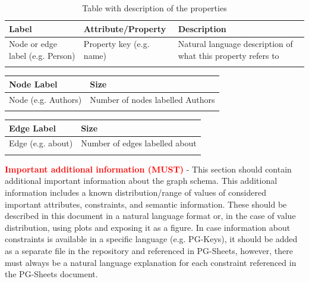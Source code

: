 \documentclass[letterpaper,11pt]{article}
\begin{document}
\begin{table}[H]
\centering
\footnotesize
\begin{tabular}{|l|l|l|}
\hline
Label                            & Attribute/Property       & Description                                                  \\ \hline
Node or edge label (e.g. Person) & Property key (e.g. name) & Natural language description of what this property refers to \\ \hline
                                 &                          &                                                              \\ \hline
\end{tabular}
\caption{Table with description of the properties}
\end{table}

\begin{minipage}{0.48\textwidth}
\centering
\footnotesize
\begin{tabular}{|l|l|}
\hline
Node Label         & Size                            \\ \hline
Node (e.g. Authors) & Number of nodes labelled Authors \\ \hline
                   &                                 \\ \hline
\end{tabular}
\end{minipage}%
\hfill
\begin{minipage}{0.48\textwidth}
\centering
\footnotesize
\begin{tabular}{|l|l|}
\hline
Edge Label        & Size                           \\ \hline
Edge (e.g. about) & Number of edges labelled about \\ \hline
                  &                                \\ \hline
\end{tabular}
\end{minipage}

\textbf{\textcolor{red}{Important additional information (MUST)}} - This section should contain additional important information about the graph schema. This additional information includes a known distribution/range of values of considered important attributes, constraints, and semantic information. These should be described in this document in a natural language format or, in the case of value distribution, using plots and exposing it as a figure. 
In case information about constraints is available in a specific language (e.g. PG-Keys), it should be added as a separate file in the repository and referenced in PG-Sheets, however, there must always be a natural language explanation for each constraint referenced in the PG-Sheets document. 
\end{document}
